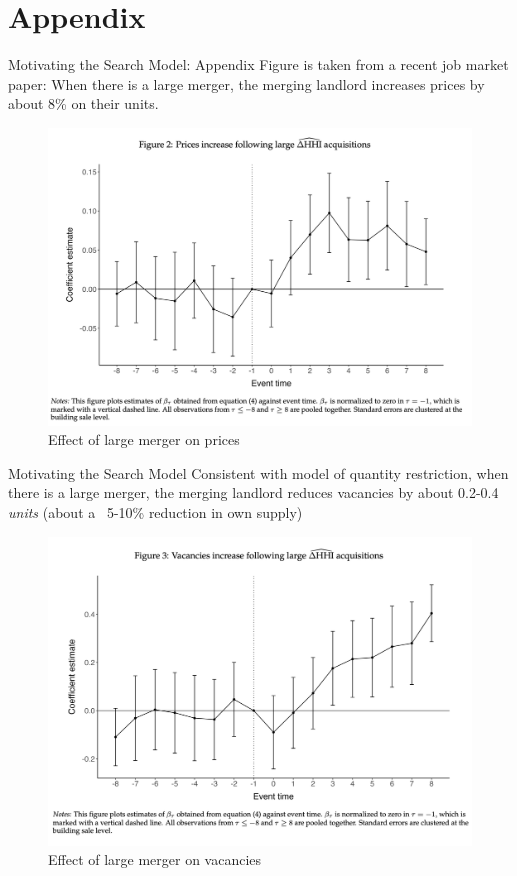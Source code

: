 \documentclass[10pt, xcolor=dvipsnames]{beamer}
\begin{document}
\section{Appendix}
\begin{frame}{Motivating the Search Model: Appendix}\label{slide:fern-prices}
Figure is taken from a recent job market paper: When there is a large merger, the merging landlord increases prices by about 8\% on their units.
    \begin{figure}
        \centering
        \includegraphics[width=0.5\linewidth]{figs/fern-jmp-prices.png}
        \caption{Effect of large merger on prices}
        \label{fig:fern-prices}
    \end{figure}
    \hyperlink{slide:searchmotivation}{}
\end{frame}

\begin{frame}{Motivating the Search Model}\label{slide:fern-vacancies}
Consistent with model of quantity restriction, when there is a large merger, the merging landlord reduces vacancies by about 0.2-0.4 \textit{units} (about a ~5-10\% reduction in own supply)
    \begin{figure}
        \centering
        \includegraphics[width=0.5\linewidth]{figs/fern-jmp-vacancy.png}
        \caption{Effect of large merger on vacancies}
        \label{fig:fern-vacancies}
    \end{figure}
    \hyperlink{slide:searchmotivation}{}
\end{frame}
\end{document}

